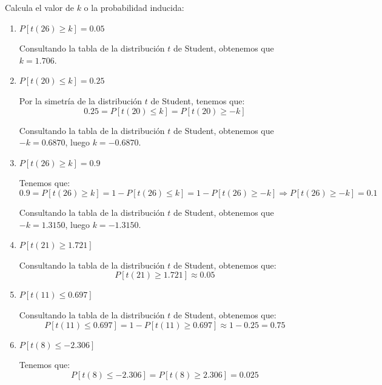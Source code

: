 \begin{ejercicio}
    Calcula el valor de $k$ o la probabilidad inducida:
    \begin{enumerate}[label=\alph*)]
        \item $P[t(26)\geq k] = 0.05$

            Consultando la tabla de la distribución $t$ de Student, obtenemos que $k = 1.706$.
        \item $P[t(20)\leq k] = 0.25$
        
            Por la simetría de la distribución $t$ de Student, tenemos que:
            \begin{equation*}
                0.25 = P[t(20)\leq k] = P[t(20)\geq -k]
            \end{equation*}

            Consultando la tabla de la distribución $t$ de Student, obtenemos que $-k = 0.6870$, luego $k = -0.6870$.
        \item $P[t(26) \geq k] = 0.9$

            Tenemos que:
            \begin{equation*}
                0.9 = P[t(26) \geq k] = 1-P[t(26) \leq k] = 1-P[t(26) \geq -k] \Longrightarrow P[t(26) \geq -k] = 0.1
            \end{equation*}

            Consultando la tabla de la distribución $t$ de Student, obtenemos que $-k = 1.3150$, luego $k = -1.3150$.
        \item $P[t(21) \geq 1.721]$

            Consultando la tabla de la distribución $t$ de Student, obtenemos que:
            \begin{equation*}
                P[t(21) \geq 1.721] \approx 0.05
            \end{equation*}
        \item $P[t(11) \leq 0.697]$
        
            Consultando la tabla de la distribución $t$ de Student, obtenemos que:
            \begin{equation*}
                P[t(11) \leq 0.697] = 1-P[t(11) \geq 0.697] \approx 1-0.25 = 0.75
            \end{equation*}
        \item $P[t(8) \leq -2.306]$
        
            Tenemos que:
            \begin{equation*}
                P[t(8) \leq -2.306] = P[t(8) \geq 2.306] = 0.025
            \end{equation*}
    \end{enumerate}
\end{ejercicio}

